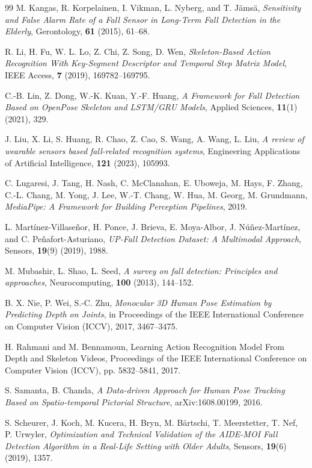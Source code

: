 \begin{thebibliography}{99}
 M. Kangas, R. Korpelainen, I. Vikman, L. Nyberg, and T. Jämsä,
\textit{Sensitivity and False Alarm Rate of a Fall Sensor in Long-Term Fall
Detection in the Elderly}, Gerontology, {\bf 61} (2015), 61--68.

 R. Li, H. Fu, W. L. Lo, Z. Chi, Z. Song, D. Wen, {\it
Skeleton-Based Action Recognition With Key-Segment Descriptor and Temporal
Step Matrix Model}, IEEE Access, {\bf 7} (2019), 169782--169795.

 C.-B. Lin, Z. Dong, W.-K. Kuan, Y.-F. Huang, {\it A Framework for
Fall Detection Based on OpenPose Skeleton and LSTM/GRU Models}, Applied
Sciences, {\bf 11}(1) (2021), 329.

 J. Liu, X. Li, S. Huang, R. Chao, Z. Cao, S. Wang, A. Wang,
L. Liu, {\it A review of wearable sensors based fall-related recognition
systems}, Engineering Applications of Artificial Intelligence, {\bf 121}
(2023), 105993.

 C. Lugaresi, J. Tang, H. Nash, C. McClanahan, E. Uboweja,
M. Hays, F. Zhang, C.-L. Chang, M. Yong, J. Lee, W.-T. Chang, W. Hua,
M. Georg, M. Grundmann, {\it MediaPipe: A Framework for Building Perception
Pipelines}, 2019.

 L. Mart\'inez-Villase\~nor, H. Ponce, J. Brieva, E. Moya-Albor,
J. N\'u\~nez-Mart\'inez, and C. Pe\~nafort-Asturiano, {\it UP-Fall Detection Dataset: A Multimodal Approach}, Sensors, {\bf 19}(9) (2019), 1988.

 M. Mubashir, L. Shao, L. Seed, {\it A survey on fall
detection: Principles and approaches}, Neurocomputing, {\bf 100} (2013),
144--152.

 B. X. Nie, P. Wei, S.-C. Zhu, {\it Monocular 3D Human Pose
Estimation by Predicting Depth on Joints}, in Proceedings of the IEEE
International Conference on Computer Vision (ICCV), 2017, 3467--3475.

H. Rahmani and M. Bennamoun,
Learning Action Recognition Model From Depth and Skeleton Videos,
Proceedings of the IEEE International Conference on Computer Vision (ICCV),
pp. 5832--5841, 2017.

 S. Samanta, B. Chanda, {\it A Data-driven Approach for
Human Pose Tracking Based on Spatio-temporal Pictorial Structure},
arXiv:1608.00199, 2016.

 S. Scheurer, J. Koch, M. Kucera, H. Bryn, M. B\"artschi,
T. Meerstetter, T. Nef, P. Urwyler, {\it Optimization and Technical Validation
of the AIDE-MOI Fall Detection Algorithm in a Real-Life Setting with Older
Adults}, Sensors, {\bf 19}(6) (2019), 1357.


\end{thebibliography}
